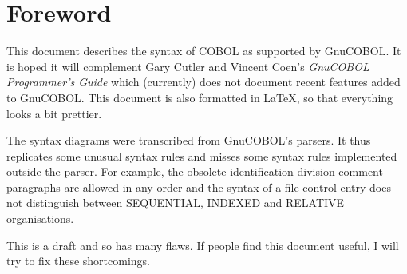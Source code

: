\chapter{Foreword}

This document describes the syntax of COBOL as supported by GnuCOBOL. It is hoped it will complement Gary Cutler and Vincent Coen's \textit{GnuCOBOL Programmer's Guide} which (currently) does not document recent features added to GnuCOBOL. This document is also formatted in \LaTeX, so that everything looks a bit prettier.

The syntax diagrams were transcribed from GnuCOBOL's parsers. It thus replicates some unusual syntax rules and misses some syntax rules implemented outside the parser. For example, the obsolete identification division comment paragraphs are allowed in any order and the syntax of \hyperref[file-control-entry]{a file-control entry} does not distinguish between SEQUENTIAL, INDEXED and RELATIVE organisations.

This is a draft and so has many flaws. If people find this document useful, I
will try to fix these shortcomings.

